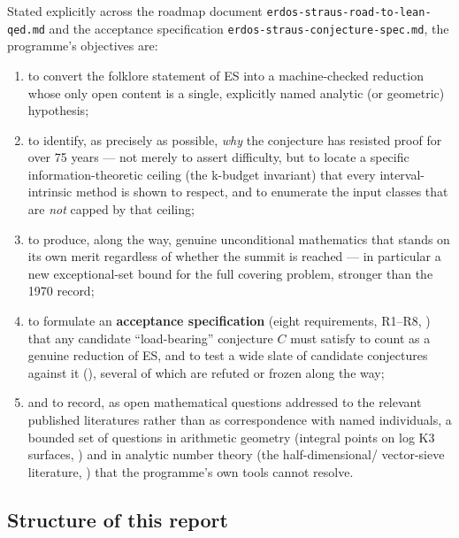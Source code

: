 \documentclass[11pt]{article}
\theoremstyle{plain}
\theoremstyle{definition}
\theoremstyle{remark}
\renewcommand{\_}{\textunderscore\allowbreak}
\begin{document}
Stated explicitly across the roadmap document \texttt{erdos-\allowbreak straus-\allowbreak road-\allowbreak to-\allowbreak lean-\allowbreak qed.md} and the
acceptance specification \texttt{erdos-\allowbreak straus-\allowbreak conjecture-\allowbreak spec.md}, the programme's objectives are:
\begin{enumerate}[leftmargin=1.6em]
  \item to convert the folklore statement of ES into a machine-checked reduction whose only
        open content is a single, explicitly named analytic (or geometric) hypothesis;
  \item to identify, as precisely as possible, \emph{why} the conjecture has resisted proof for
        over 75 years — not merely to assert difficulty, but to locate a specific
        information-theoretic ceiling (the k-budget invariant) that every interval-intrinsic
        method is shown to respect, and to enumerate the input classes that are \emph{not}
        capped by that ceiling;
  \item to produce, along the way, genuine unconditional mathematics that stands on its own
        merit regardless of whether the summit is reached — in particular a new exceptional-set
        bound for the full covering problem, stronger than the 1970 record;
  \item to formulate an \textbf{acceptance specification} (eight requirements, R1--R8,
        ) that any candidate ``load-bearing'' conjecture $C$ must satisfy to
        count as a genuine reduction of ES, and to test a wide slate of candidate conjectures
        against it (), several of which are refuted or frozen along the
        way;
  \item and to record, as open mathematical questions addressed to the relevant published
        literatures rather than as correspondence with named individuals, a bounded set of
        questions in arithmetic geometry (integral points on log K3 surfaces,
        ) and in analytic number theory (the half-dimensional/
        vector-sieve literature, ) that the programme's own tools cannot
        resolve.
\end{enumerate}

\subsection{Structure of this report}
\end{document}
